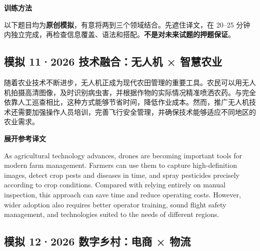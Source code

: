 \documentclass[a4paper,11pt,UTF8,fontset=none]{ctexart}
\begin{document}
\begin{tcolorbox}[enhanced,breakable,boxrule=0.35pt,colback=VeryPaleBlue,colframe=AccentBlue!40,left=7pt,right=7pt,top=4pt,bottom=4pt,borderline west={2pt}{0pt}{AccentBlue},before skip=4pt,after skip=6pt]
{\bfseries\color{AccentBlue} 训练方法}\par\vspace{1pt}
\noindent 以下题目均为{\bfseries 原创模拟}，有意将两到三个领域结合。先遮住译文，在 20–25 分钟内独立完成，再检查信息覆盖、语法和搭配。{\bfseries 不是对未来试题的押题保证}。\par


\end{tcolorbox}

\subsection{模拟 11·2026 技术融合：无人机 × 智慧农业}

\par

\noindent 随着农业技术不断进步，无人机正成为现代农田管理的重要工具。农民可以用无人机拍摄高清图像，及时识别病虫害，并根据作物的实际情况精准喷洒农药。与完全依靠人工巡查相比，这种方式能够节省时间，降低作业成本。然而，推广无人机技术还需要加强操作人员培训，完善飞行安全管理，并确保技术能够适应不同地区的农业需求。\par

\noindent\colorbox{HeadBlue}{\strut {\bfseries 展开参考译文}}\par\vspace{1pt}

\noindent As agricultural technology advances, drones are becoming important tools for modern farm management. Farmers can use them to capture high-definition images, detect crop pests and diseases in time, and spray pesticides precisely according to crop conditions. Compared with relying entirely on manual inspection, this approach can save time and reduce operating costs. However, wider adoption also requires better operator training, sound flight safety management, and technologies suited to the needs of different regions.\par

\vspace{4pt}

\subsection{模拟 12·2026 数字乡村：电商 × 物流}
\end{document}
